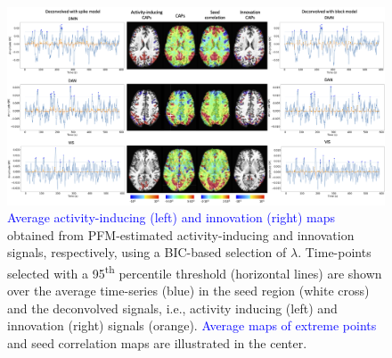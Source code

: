 \begin{figure}[t!]
    \begin{center}
        \includegraphics[width=\textwidth]{figures/caps.png}
    \end{center}
    \caption{\textcolor{blue}{Average activity-inducing
    (left) and
    innovation (right) maps} obtained from PFM-estimated activity-inducing and
    innovation signals, respectively, using a BIC-based selection of $\lambda$.
    Time-points selected with a 95\textsuperscript{th} percentile threshold
    (horizontal lines) are shown over the average time-series (blue) in the seed
    region (white cross) and the deconvolved signals, i.e., activity inducing
    (left) and innovation (right) signals (orange). \textcolor{blue}{Average
    maps of extreme points} and seed correlation maps are illustrated in the center.}
\label{fig:caps}
\end{figure}